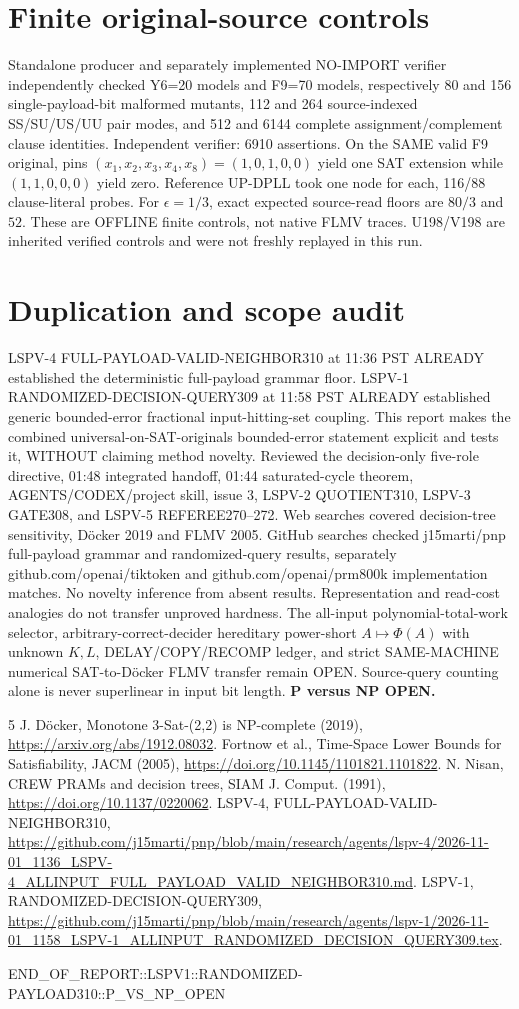 \documentclass[11pt]{article}
\begin{document}
\section{Finite original-source controls}
Standalone producer and separately implemented NO-IMPORT verifier independently checked Y6=20 models and F9=70 models, respectively 80 and 156 single-payload-bit malformed mutants, 112 and 264 source-indexed SS/SU/US/UU pair modes, and 512 and 6144 complete assignment/complement clause identities. Independent verifier: 6910 assertions. On the SAME valid F9 original, pins $(x_1,x_2,x_3,x_4,x_8)=(1,0,1,0,0)$ yield one SAT extension while $(1,1,0,0,0)$ yield zero. Reference UP-DPLL took one node for each, 116/88 clause-literal probes. For $\epsilon=1/3$, exact expected source-read floors are $80/3$ and $52$. These are OFFLINE finite controls, not native FLMV traces. U198/V198 are inherited verified controls and were not freshly replayed in this run.
\section{Duplication and scope audit}
LSPV-4 FULL-PAYLOAD-VALID-NEIGHBOR310 at 11:36 PST ALREADY established the deterministic full-payload grammar floor. LSPV-1 RANDOMIZED-DECISION-QUERY309 at 11:58 PST ALREADY established generic bounded-error fractional input-hitting-set coupling. This report makes the combined universal-on-SAT-originals bounded-error statement explicit and tests it, WITHOUT claiming method novelty. Reviewed the decision-only five-role directive, 01:48 integrated handoff, 01:44 saturated-cycle theorem, AGENTS/CODEX/project skill, issue 3, LSPV-2 QUOTIENT310, LSPV-3 GATE308, and LSPV-5 REFEREE270--272. Web searches covered decision-tree sensitivity, D\"ocker 2019 and FLMV 2005. GitHub searches checked j15marti/pnp full-payload grammar and randomized-query results, separately github.com/openai/tiktoken and github.com/openai/prm800k implementation matches. No novelty inference from absent results. Representation and read-cost analogies do not transfer unproved hardness.
The all-input polynomial-total-work selector, arbitrary-correct-decider hereditary power-short $A\mapsto\Phi(A)$ with unknown $K,L$, DELAY/COPY/RECOMP ledger, and strict SAME-MACHINE numerical SAT-to-D\"ocker FLMV transfer remain OPEN. Source-query counting alone is never superlinear in input bit length. \textbf{P versus NP OPEN.}
\begin{thebibliography}{5}
 J. D\"ocker, Monotone 3-Sat-(2,2) is NP-complete (2019), \url{https://arxiv.org/abs/1912.08032}.
 Fortnow et al., Time-Space Lower Bounds for Satisfiability, JACM (2005), \url{https://doi.org/10.1145/1101821.1101822}.
 N. Nisan, CREW PRAMs and decision trees, SIAM J. Comput. (1991), \url{https://doi.org/10.1137/0220062}.
 LSPV-4, FULL-PAYLOAD-VALID-NEIGHBOR310, \url{https://github.com/j15marti/pnp/blob/main/research/agents/lspv-4/2026-11-01_1136_LSPV-4_ALLINPUT_FULL_PAYLOAD_VALID_NEIGHBOR310.md}.
 LSPV-1, RANDOMIZED-DECISION-QUERY309, \url{https://github.com/j15marti/pnp/blob/main/research/agents/lspv-1/2026-11-01_1158_LSPV-1_ALLINPUT_RANDOMIZED_DECISION_QUERY309.tex}.
\end{thebibliography}
\noindent END\_OF\_REPORT::LSPV1::RANDOMIZED-PAYLOAD310::P\_VS\_NP\_OPEN
\end{document}

